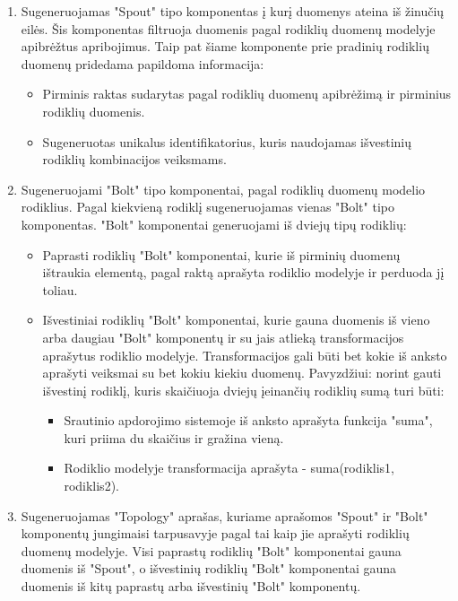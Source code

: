 \documentclass{VUMIFPSbakalaurinis}
\begin{document}
\begin{enumerate}
    \item Sugeneruojamas "Spout" tipo komponentas į kurį duomenys ateina iš žinučių eilės. Šis komponentas filtruoja duomenis pagal rodiklių duomenų modelyje apibrėžtus apribojimus. Taip pat šiame komponente prie pradinių rodiklių duomenų pridedama papildoma informacija: 
    \begin{itemize}
        \item Pirminis raktas sudarytas pagal rodiklių duomenų apibrėžimą ir pirminius rodiklių duomenis.
        \item Sugeneruotas unikalus identifikatorius, kuris naudojamas išvestinių rodiklių kombinacijos veiksmams.
    \end{itemize}
    \item Sugeneruojami "Bolt" tipo komponentai, pagal rodiklių duomenų modelio rodiklius. Pagal kiekvieną rodiklį sugeneruojamas vienas "Bolt" tipo komponentas.
    "Bolt" komponentai generuojami iš dviejų tipų rodiklių:
    \begin{itemize}
        \item Paprasti rodiklių "Bolt" komponentai, kurie iš pirminių duomenų ištraukia elementą, pagal raktą aprašyta rodiklio modelyje ir perduoda jį toliau.
        \item Išvestiniai rodiklių "Bolt" komponentai, kurie gauna duomenis iš vieno arba daugiau "Bolt" komponentų ir su jais atlieką transformacijos aprašytus rodiklio modelyje. Transformacijos gali būti bet kokie iš anksto aprašyti veiksmai su bet kokiu kiekiu duomenų. Pavyzdžiui: norint gauti išvestinį rodiklį, kuris skaičiuoja dviejų įeinančių rodiklių sumą turi būti:
        \begin{itemize}
            \item Srautinio apdorojimo sistemoje iš anksto aprašyta funkcija "suma", kuri priima du skaičius ir gražina vieną.
            \item Rodiklio modelyje transformacija aprašyta - suma(rodiklis1, rodiklis2).
        \end{itemize} 
    \end{itemize}
    \item Sugeneruojamas "Topology" aprašas, kuriame aprašomos "Spout" ir "Bolt" komponentų jungimaisi tarpusavyje pagal tai kaip jie aprašyti rodiklių duomenų modelyje. Visi paprastų rodiklių "Bolt" komponentai gauna duomenis iš "Spout", o išvestinių rodiklių "Bolt" komponentai gauna duomenis iš kitų paprastų arba išvestinių "Bolt" komponentų.
\end{enumerate}
\end{document}
